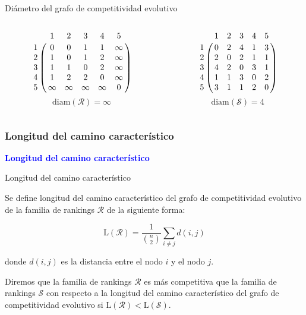 \documentclass[10pt]{beamer}
\begin{document}
	\begin{frame}{Diámetro del grafo de competitividad evolutivo}
		\begin{ejemplo}[continuación]
			\begin{columns}[t] %
				\begin{column}{.50\textwidth}
					\begin{equation*}
					\bordermatrix{
						& 1 & 2 & 3 & 4 & 5 \cr
						1 &	0 & 0 & 1 & 1 & \infty \cr
						2 & 1 & 0 & 1 & 2 & \infty \cr
						3 & 1 & 1 & 0 & 2 & \infty \cr
						4 & 1 & 2 & 2 & 0 & \infty \cr
						5 & \infty & \infty & \infty & \infty  &  0  \cr
					}
					\end{equation*}
					\[ \mathrm{diam}(\mathcal{R}) = \infty \]
				\end{column}%
				\hfill%
				\begin{column}{.50\textwidth}
					\begin{equation*}
					\bordermatrix{
						& 1 & 2 & 3 & 4 & 5 \cr
						1 &	0 & 2 & 4 & 1 & 3 \cr
						2 & 2 & 0 & 2 & 1 & 1 \cr
						3 & 4 & 2 & 0 & 3 & 1 \cr
						4 & 1 & 1 & 3 & 0 & 2 \cr
						5 & 3 & 1 & 1 & 2 & 0  \cr
					}
					\end{equation*}
					\[ \mathrm{diam}(\mathcal{S}) = 4 \]
				\end{column}%
			\end{columns}
		\end{ejemplo}
	\end{frame}
	
	\subsubsection{Longitud del camino característico}
	
	\begin{frame}
		\begin{center}
			\Huge\textbf{\textsf{\textcolor{blue}{Longitud del camino característico}}}
		\end{center}
	\end{frame}
	
	\begin{frame}{Longitud del camino característico}
		\begin{defi}
			Se define longitud del camino característico del grafo de competitividad evolutivo de la familia de rankings $\mathcal{R}$ de la siguiente forma:
			
			\begin{equation}
			\mathrm{L}(\mathcal{R}) = \dfrac{1}{\binom{n}{2}} \sum_{i\neq j} d(i,j)
			\end{equation}
			
			donde $d(i,j)$ es la distancia entre el nodo $i$ y el nodo $j$.
		\end{defi}
		
		\begin{defi}
			Diremos que la familia de rankings $\mathcal{R}$ es más competitiva que la familia de rankings $\mathcal{S}$ con respecto a la longitud del camino característico del grafo de competitividad evolutivo si $\mathrm{L}(\mathcal{R}) < \mathrm{L}(\mathcal{S})$.
		\end{defi}
	\end{frame}
	
\end{document}
